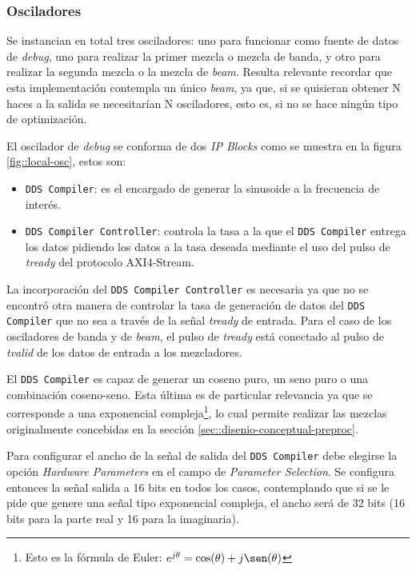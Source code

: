 \documentclass[../../main.tex]{subfiles}
\begin{document}
\subsubsection{Osciladores}
Se instancian en total tres osciladores: uno para funcionar como fuente de datos de \textit{debug}, uno para realizar la primer mezcla o mezcla de banda, y otro para realizar la segunda mezcla o la mezcla de \textit{beam}. Resulta relevante recordar que esta implementación contempla un único \textit{beam}, ya que, si se quisieran obtener N haces a la salida se necesitarían N osciladores, esto es, si no se hace ningún tipo de optimización.

El oscilador de \textit{debug} se conforma de dos \textit{IP Blocks} como se muestra en la figura \ref{fig::local-osc}, estos son:
\begin{itemize}
    \item \texttt{DDS Compiler}: es el encargado de generar la sinusoide a la frecuencia de interés.
    \item \texttt{DDS Compiler Controller}: controla la tasa a la que el \texttt{DDS Compiler} entrega los datos pidiendo los datos a la tasa deseada mediante el uso del pulso de \textit{tready} del protocolo AXI4-Stream.
\end{itemize}

La incorporación del \texttt{DDS Compiler Controller} es necesaria ya que no se encontró otra manera de controlar la tasa de generación de datos del \texttt{DDS Compiler} que no sea a través de la señal \textit{tready} de entrada. Para el caso de los osciladores de banda y de \textit{beam}, el pulso de \textit{tready} está conectado al pulso de \textit{tvalid} de los datos de entrada a los mezcladores.

El \texttt{DDS Compiler} es capaz de generar un coseno puro, un seno puro o una combinación coseno-seno. Esta última es de particular relevancia ya que se corresponde a una exponencial compleja\footnote{Esto es la fórmula de Euler: $e^{j \theta} = \cos(\theta) + j\sen(\theta)$}, lo cual permite realizar las mezclas originalmente concebidas en la sección \ref{sec::disenio-conceptual-preproc}.

Para configurar el ancho de la señal de salida del \texttt{DDS Compiler} debe elegirse la opción \textit{Hardware Parameters} en el campo de \textit{Parameter Selection}. Se configura entonces la señal salida a 16 bits en todos los casos, contemplando que si se le pide que genere una señal tipo exponencial compleja, el ancho será de 32 bits (16 bits para la parte real y 16 para la imaginaria).
\end{document}
